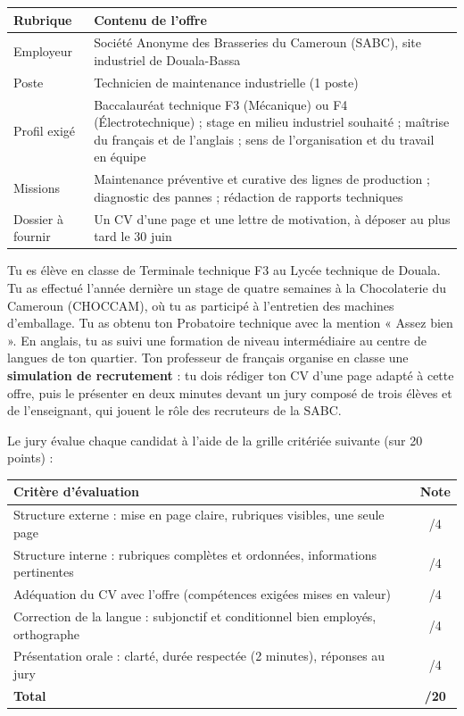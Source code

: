 \documentclass[11pt]{article}
\begin{document}
\begin{center}
\begin{tabularx}{\linewidth}{|l|X|}
\hline
\rowcolor{popblueL} \textbf{Rubrique} & \textbf{Contenu de l'offre} \\
\hline
Employeur & Société Anonyme des Brasseries du Cameroun (SABC), site industriel de Douala-Bassa \\
\hline
Poste & Technicien de maintenance industrielle (1 poste) \\
\hline
Profil exigé & Baccalauréat technique F3 (Mécanique) ou F4 (Électrotechnique) ; stage en milieu industriel souhaité ; maîtrise du français et de l'anglais ; sens de l'organisation et du travail en équipe \\
\hline
Missions & Maintenance préventive et curative des lignes de production ; diagnostic des pannes ; rédaction de rapports techniques \\
\hline
Dossier à fournir & Un CV d'une page et une lettre de motivation, à déposer au plus tard le 30 juin \\
\hline
\end{tabularx}
\end{center}

Tu es élève en classe de Terminale technique F3 au Lycée technique de Douala. Tu as effectué l'année dernière un stage de quatre semaines à la Chocolaterie du Cameroun (CHOCCAM), où tu as participé à l'entretien des machines d'emballage. Tu as obtenu ton Probatoire technique avec la mention « Assez bien ». En anglais, tu as suivi une formation de niveau intermédiaire au centre de langues de ton quartier. Ton professeur de français organise en classe une \textbf{simulation de recrutement} : tu dois rédiger ton CV d'une page adapté à cette offre, puis le présenter en deux minutes devant un jury composé de trois élèves et de l'enseignant, qui jouent le rôle des recruteurs de la SABC.

Le jury évalue chaque candidat à l'aide de la grille critériée suivante (sur 20 points) :

\begin{center}
\begin{tabularx}{\linewidth}{|X|c|}
\hline
\rowcolor{popblueL} \textbf{Critère d'évaluation} & \textbf{Note} \\
\hline
Structure externe : mise en page claire, rubriques visibles, une seule page & /4 \\
\hline
Structure interne : rubriques complètes et ordonnées, informations pertinentes & /4 \\
\hline
Adéquation du CV avec l'offre (compétences exigées mises en valeur) & /4 \\
\hline
Correction de la langue : subjonctif et conditionnel bien employés, orthographe & /4 \\
\hline
Présentation orale : clarté, durée respectée (2 minutes), réponses au jury & /4 \\
\hline
\textbf{Total} & \textbf{/20} \\
\hline
\end{tabularx}
\end{center}
\end{document}
